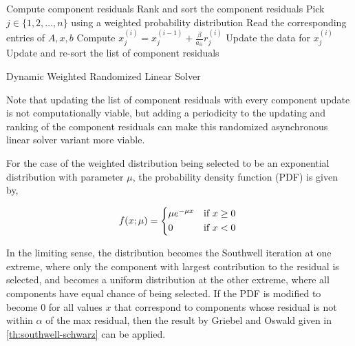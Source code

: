 \documentclass{article}
\theoremstyle{definition}
\theoremstyle{example}
\theoremstyle{example}
\theoremstyle{example}
\begin{document}
\begin{algorithm}[ht!]
	\DontPrintSemicolon
	Compute component residuals \;
	Rank and sort the component residuals \;
	 {
		 {
			Pick $j \in \{1, 2, \ldots, n\}$ using a weighted probability distribution \; \label{alg:pickrandom4}
			Read the corresponding entries of $A, x, b$ \label{step:read4}\;
			Compute $x^{(i)}_j = x^{(i-1)}_j + \frac{\beta}{a_{ii}} r^{(i)}_j$ \;
			Update the data for $x^{(i)}_j$ \;
			Update and re-sort the list of component residuals \label{step:dynamic-update} \;
		}
	}
	\caption{Dynamic Weighted Randomized Linear Solver}
	\label{algo:randomized-computational-model4}
\end{algorithm}

Note that updating the list of component residuals with every component update is not computationally viable, but adding a periodicity to the updating and ranking of the component residuals can make this randomized asynchronous linear solver variant more viable.

For the case of the weighted distribution being selected to be an exponential distribution with parameter $\mu$, the probability density function (PDF) is given by,

\begin{equation}
	\label{eq:exponential-pdf}
		f(x; \mu) =
		 \begin{cases*}
					\mu e^{-\mu x}	& if  $x \geq 0$  \\
								  0 & if $x < 0$
		 \end{cases*}
\end{equation}

In the limiting sense, the distribution becomes the Southwell iteration at one extreme, where only the component with largest contribution to the residual is selected, and becomes a uniform distribution at the other extreme, where all components have equal chance of being selected. If the PDF is modified to become 0 for all values $x$ that correspond to components whose residual is not within $\alpha$ of the max residual, then the result by Griebel and Oswald given in \cref{th:southwell-schwarz} can be applied.



\end{document}
